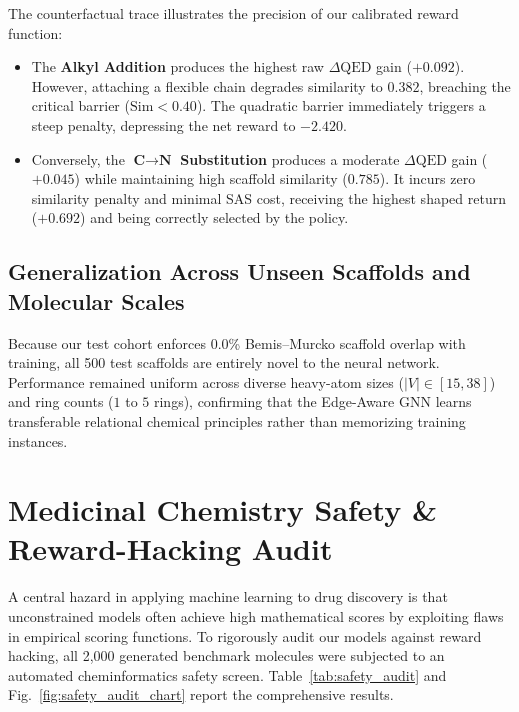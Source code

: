 \documentclass{ieeeaccess}
\begin{document}
The counterfactual trace illustrates the precision of our calibrated reward function:
\begin{itemize}
    \item The \textbf{Alkyl Addition} produces the highest raw $\Delta\text{QED}$ gain ($+0.092$). However, attaching a flexible chain degrades similarity to $0.382$, breaching the critical barrier ($\text{Sim} < 0.40$). The quadratic barrier immediately triggers a steep penalty, depressing the net reward to $\mathbf{-2.420}$.
    \item Conversely, the $\mathbf{\text{C}\to\text{N}}$ \textbf{Substitution} produces a moderate $\Delta\text{QED}$ gain ($+0.045$) while maintaining high scaffold similarity ($0.785$). It incurs zero similarity penalty and minimal SAS cost, receiving the highest shaped return ($\mathbf{+0.692}$) and being correctly selected by the policy.
\end{itemize}

\subsection{Generalization Across Unseen Scaffolds and Molecular Scales}
Because our test cohort enforces 0.0\% Bemis--Murcko scaffold overlap with training, all 500 test scaffolds are entirely novel to the neural network. Performance remained uniform across diverse heavy-atom sizes ($|V| \in [15, 38]$) and ring counts ($1$ to $5$ rings), confirming that the Edge-Aware GNN learns transferable relational chemical principles rather than memorizing training instances.


\section{Medicinal Chemistry Safety \& Reward-Hacking Audit}
\label{sec:audit}
A central hazard in applying machine learning to drug discovery is that unconstrained models often achieve high mathematical scores by exploiting flaws in empirical scoring functions. To rigorously audit our models against reward hacking, all 2,000 generated benchmark molecules were subjected to an automated cheminformatics safety screen. Table~\ref{tab:safety_audit} and Fig.~\ref{fig:safety_audit_chart} report the comprehensive results.
\end{document}
